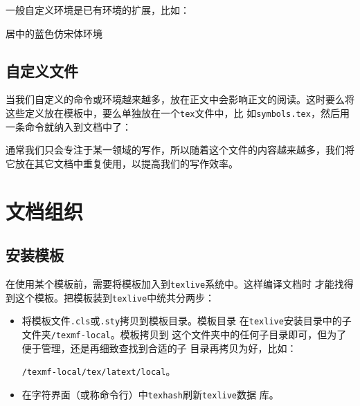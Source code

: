 一般自定义环境是已有环境的扩展，比如：

\begin{codeout}
  \newenvironment{centertt}{%
      \begin{center} \fangsong \color{blue}
    }%
    {%
      \end{center}
    }%

    \begin{centertt}
      居中的蓝色仿宋体环境
    \end{centertt}

\end{codeout}
  
\subsection{自定义文件}

当我们自定义的命令或环境越来越多，放在正文中会影响正文的阅读。这时要么将
这些定义放在模板中，要么单独放在一个\verb!tex!文件中，比
如\verb!symbols.tex!，然后用一条命令就纳入到文档中了：

\begin{code}
  
\end{code}

通常我们只会专注于某一领域的写作，所以随着这个文件的内容越来越多，我们将
它放在其它文档中重复使用，以提高我们的写作效率。


\section{文档组织}

\subsection{安装模板}
\label{subsec:installtemplate}

在使用某个模板前，需要将模板加入到\texttt{texlive}系统中。这样编译文档时
才能找得到这个模板。把模板装到\texttt{texlive}中统共分两步：

\begin{itemize}
\item 将模板文件\texttt{.cls}或\texttt{.sty}拷贝到模板目录。模板目录
  在\texttt{texlive}安装目录中的子文件夹\texttt{/texmf-local}。模板拷贝到
  这个文件夹中的任何子目录即可，但为了便于管理，还是再细致查找到合适的子
  目录再拷贝为好，比如：

  \texttt{/texmf-local/tex/latext/local}。
\item 在字符界面（或称命令行）中\texttt{texhash}刷新\texttt{texlive}数据
  库。
\end{itemize}

